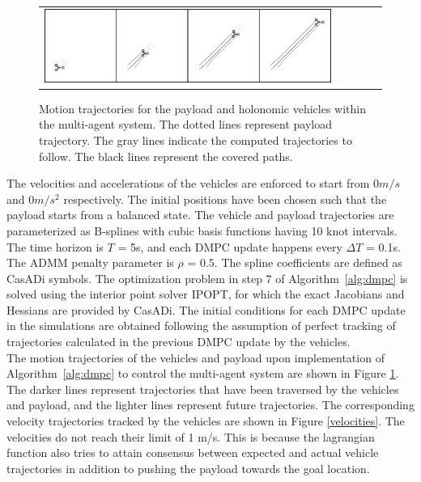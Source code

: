 \documentclass[letterpaper, 10 pt, conference]{ieeeconf}
\begin{document}
\begin{figure}[h]
	\centering
	\setlength{\tabcolsep}{0.1em}
	\begin{tabular}[t]{rrrrr}
		\includegraphics[scale=0.245]{figures/no_obst.pdf}
	\end{tabular}
	\caption{Motion trajectories for the payload and holonomic vehicles within the multi-agent system. The dotted lines represent payload trajectory. The gray lines indicate the computed trajectories to follow. The black lines represent the covered paths.}
	\label{trajectories}
\end{figure}
The velocities and accelerations of the vehicles are enforced to start from 0$m/s$ and 0$m/s^2$ respectively. The initial positions have been chosen such that the payload starts from a balanced state. The vehicle and payload trajectories are parameterized as B-splines with cubic basis functions having 10 knot intervals. The time horizon is $T$ = 5s, and each DMPC update happens every $\Delta T$ = 0.1s. The ADMM penalty parameter is $\rho$ = 0.5. The spline coefficients are defined as CasADi symbols. The optimization problem in step 7 of Algorithm~\ref{alg:dmpc} is solved using the interior point solver IPOPT, for which the exact Jacobians and Hessians are provided by CasADi. The initial conditions for each DMPC update in the simulations are obtained following the assumption of perfect tracking of trajectories calculated in the previous DMPC update by the vehicles. 
\\
\indent
The motion trajectories of the vehicles and payload upon implementation of Algorithm~\ref{alg:dmpc} to control the multi-agent system are shown in Figure \ref{trajectories}. The darker lines represent trajectories that have been traversed by the vehicles and payload, and the lighter lines represent future trajectories. The corresponding velocity trajectories tracked by the vehicles are shown in Figure \ref{velocities}. The velocities do not reach their limit of 1 m/s. This is because the lagrangian function also tries to attain consensus between expected and actual vehicle trajectories in addition to pushing the payload towards the goal location.
\end{document}

